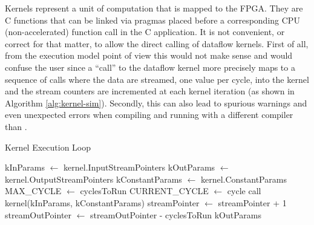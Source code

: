 Kernels represent a unit of computation that is mapped to the FPGA.
They are C functions that can be linked via pragmas placed before a
corresponding CPU (non-accelerated) function call in the C
application.  It is not convenient, or correct for that matter, to
allow the direct calling of dataflow kernels. First of all, from the
execution model point of view this would not make sense and would
confuse the user since a ``call'' to the dataflow kernel more
precisely maps to a sequence of calls where the data are streamed, one
value per cycle, into the kernel and the stream counters are
incremented at each kernel iteration (as shown in Algorithm
\ref{alg:kernel-sim}).  Secondly, this can also lead to spurious
warnings and even unexpected errors when compiling and running with a
different compiler than \fastc{}.

\begin{algorithm}
  \caption{Kernel Execution Loop}
  \label{alg:kernel-sim}
  \begin{algorithmic}
    \State kInParams $\gets$ kernel.InputStreamPointers
    \State kOutParams $\gets$ kernel.OutputStreamPointers
    \State kConstantParams $\gets$ kernel.ConstantParams
    \State MAX\_CYCLE $\gets$ cyclesToRun
    \State CURRENT\_CYCLE $\gets$ cycle
    \State call kernel(kInParams, kConstantParams)
    \State streamPointer $\gets$ streamPointer + 1
    \EndFor
    \EndFor
    \State streamOutPointer $\gets$ streamOutPointer - cyclesToRun
    \EndFor
    \State \Return kOutParams
    \EndFunction
  \end{algorithmic}
\end{algorithm}

